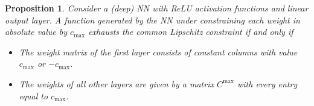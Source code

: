 \documentclass{article} %
\newtheorem{proposition}{Proposition}
\begin{document}

\begin{proposition}\label{prp:weightclipping}
Consider a (deep) NN with ReLU activation functions and linear output layer.
%
A function generated by the NN under constraining each weight in absolute value by $c_{\text{max}}$ exhausts the common Lipschitz constraint if and only if 
\begin{itemize}
\item[(a)] 
The weight matrix of the first layer consists of constant columns with value $c_{\text{max}}$ or $-c_{\text{max}}$. 
\item[(b)] 
The weights of all other layers are given by a
matrix $C^{\text{max}}$ with every entry equal to $c_{\text{max}}$.  
\end{itemize} 
\end{proposition}
\end{document}
